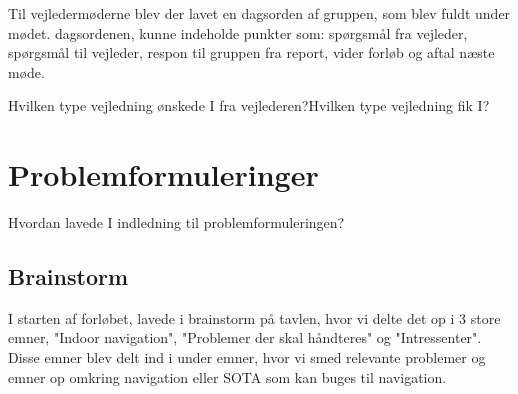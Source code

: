\documentclass[a4paper,12pt,twoside,openright]{memoir}
\begin{document}
Til vejledermøderne blev der lavet en dagsorden af gruppen, som blev fuldt under mødet. dagsordenen, kunne indeholde punkter som: spørgsmål fra vejleder, spørgsmål til vejleder, respon til gruppen fra report, vider forløb og aftal næste møde.\newline

Hvilken type vejledning ønskede I fra vejlederen?\newline Hvilken type vejledning fik I?\newline

        \section{Problemformuleringer}

Hvordan lavede I indledning til problemformuleringen?\newline

        \subsection{Brainstorm}
        
I starten af forløbet, lavede i brainstorm på tavlen, hvor vi delte det op i 3 store  emner, "Indoor navigation", "Problemer der skal håndteres" og "Intressenter". Disse emner blev delt ind i under emner, hvor vi smed relevante problemer og emner op omkring navigation eller SOTA som kan buges til navigation.\newline
\end{document}
